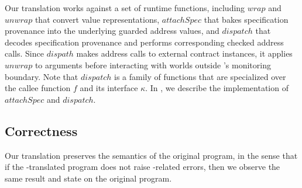 Our translation works against a set of runtime functions, including
$\mathit{wrap}$ and $\mathit{unwrap}$ that convert value representations,
$\mathit{attachSpec}$ that bakes specification provenance into the underlying guarded address values, and
$\mathit{dispatch}$ that decodes specification provenance and performs corresponding
checked address calls. %
Since $\mathit{dispath}$ makes address calls to external contract instances,
it applies $\mathit{unwrap}$ to arguments before interacting with worlds outside \lang's monitoring boundary.
Note that $\mathit{dispatch}$ is a family of functions that are specialized over the callee 
function $f$ and its interface $\kappa$.
In , we describe the implementation of $\mathit{attachSpec}$ and $\mathit{dispatch}$.

\iffalse
Take the deposit function from \Cref{sec:examples-higher-order} as an example. The translated Solidity program is as follows.
\begin{lstlisting}[language=Consol]
deposit(token, amount) requires msg.sender == owner
where {
  IERC20(token).transferFrom(sender, addr, amount) returns (success)
  requires amount > 0   ensures success
}
\end{lstlisting}
\vspace{-0.25em}
\begin{lstlisting}
function deposit(address$^\uparrow$ token, uint amount) public {
  IERC20(token).transferFrom(...); // the call is now guarded
}
\end{lstlisting}
\fi


\subsection{Correctness} \label{sec:correctness}


Our translation preserves the semantics of the original program, in 
the sense that if the \lang-translated program does not raise \lang-related 
errors, then we observe the same result and state on the original program.

